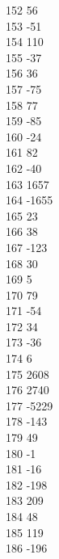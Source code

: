 { 152	56 \\
 153	-51 \\
 154	110 \\
 155	-37 \\
 156	36 \\
 157	-75 \\
 158	77 \\
 159	-85 \\
 160	-24 \\
 161	82 \\
 162	-40 \\
 163	1657 \\
 164	-1655 \\
 165	23 \\
 166	38 \\
 167	-123 \\
 168	30 \\
 169	5 \\
 170	79 \\
 171	-54 \\
 172	34 \\
 173	-36 \\
 174	6 \\
 175	2608 \\
 176	2740 \\
 177	-5229 \\
 178	-143 \\
 179	49 \\
 180	-1 \\
 181	-16 \\
 182	-198 \\
 183	209 \\
 184	48 \\
 185	119 \\
 186	-196 \\
}
